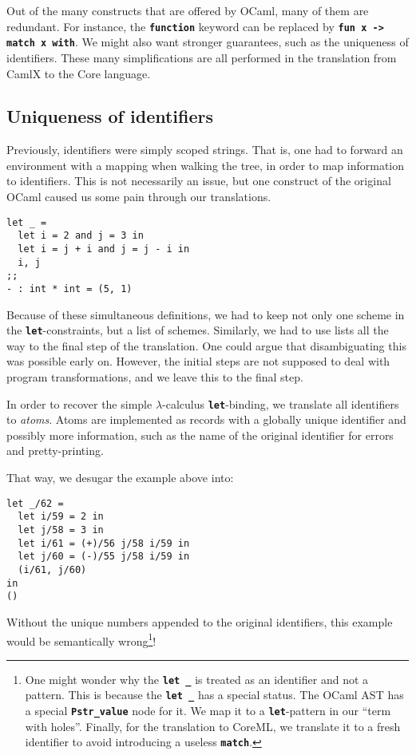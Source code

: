 \documentclass[10pt,a4paper,twoside,titlepage,twocolumn]{article}
\newcommand{\code}[1]{\textbf{\texttt{#1}}}
\begin{document}
Out of the many constructs that are offered by OCaml, many of them are
redundant. For instance, the \code{function} keyword can be replaced by
\code{fun x -> match x with}. We might also want stronger guarantees, such as
the uniqueness of identifiers. These many simplifications are all performed in the
translation from CamlX to the Core language.

\subsection{Uniqueness of identifiers}

Previously, identifiers were simply scoped strings. That is, one had to
forward an environment with a mapping when walking the tree, in order to map
information to identifiers. This is not necessarily an issue, but one construct
of the original OCaml caused us some pain through our translations.

\begin{verbatim}
let _ =
  let i = 2 and j = 3 in
  let i = j + i and j = j - i in
  i, j
;;
- : int * int = (5, 1)
\end{verbatim}

Because of these simultaneous definitions, we had to keep not only one scheme in
the \code{let}-constraints, but a list of schemes. Similarly, we had to use
lists all the way to the final step of the translation. One could argue that
disambiguating this was possible early on. However, the initial steps are not
supposed to deal with program transformations, and we leave this to the final
step.

In order to recover the simple $\lambda$-calculus \code{let}-binding, we
translate all identifiers to \emph{atoms}. Atoms are implemented as records with
a globally unique identifier and possibly more information, such as the name of
the original identifier for errors and pretty-printing.

That way, we desugar the example above into:

\begin{verbatim}
let _/62 =
  let i/59 = 2 in
  let j/58 = 3 in
  let i/61 = (+)/56 j/58 i/59 in
  let j/60 = (-)/55 j/58 i/59 in
  (i/61, j/60)
in
()
\end{verbatim}

Without the unique numbers appended to the original identifiers, this example
would be semantically wrong\footnote{One might wonder why the \code{let \_} is
treated as an identifier and not a pattern. This is because the \code{let \_}
has a special status. The OCaml AST has a special \code{Pstr\_value} node for
it. We map it to a \code{let}-pattern in our ``term with holes''. Finally, for
the translation to CoreML, we translate it to a fresh identifier to avoid
introducing a useless \code{match}.}!
\end{document}
